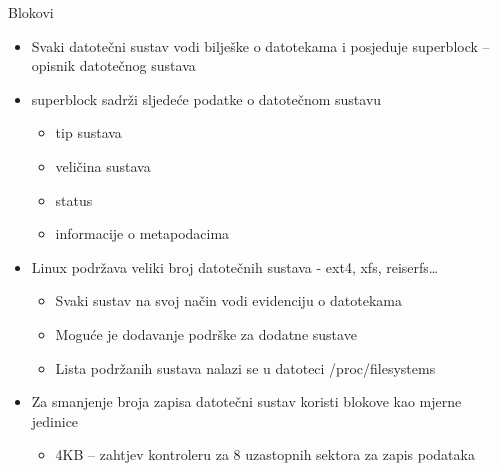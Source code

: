 \documentclass[croatian,t]{beamer} %
\begin{document}
	\begin{frame}{Blokovi}
		\begin{itemize}
			\item Svaki datotečni sustav vodi bilješke o datotekama i posjeduje superblock – opisnik datotečnog sustava
			\item superblock sadrži sljedeće podatke o datotečnom sustavu
			\begin{itemize}
				\item tip sustava
				\item veličina sustava
				\item status
				\item informacije o metapodacima
			\end{itemize}
			\item Linux podržava veliki broj datotečnih sustava - ext4, xfs, reiserfs\ldots
			\begin{itemize}
				\item Svaki sustav na svoj način vodi evidenciju o datotekama
				\item Moguće je dodavanje podrške za dodatne sustave
				\item Lista podržanih sustava nalazi se u datoteci /proc/filesystems
			\end{itemize}
			\item Za smanjenje broja zapisa datotečni sustav koristi blokove kao mjerne jedinice
			\begin{itemize}
				\item 4KB – zahtjev kontroleru za 8 uzastopnih sektora za zapis podataka
			\end{itemize}
		\end{itemize}
	\end{frame}	
	
\end{document}
